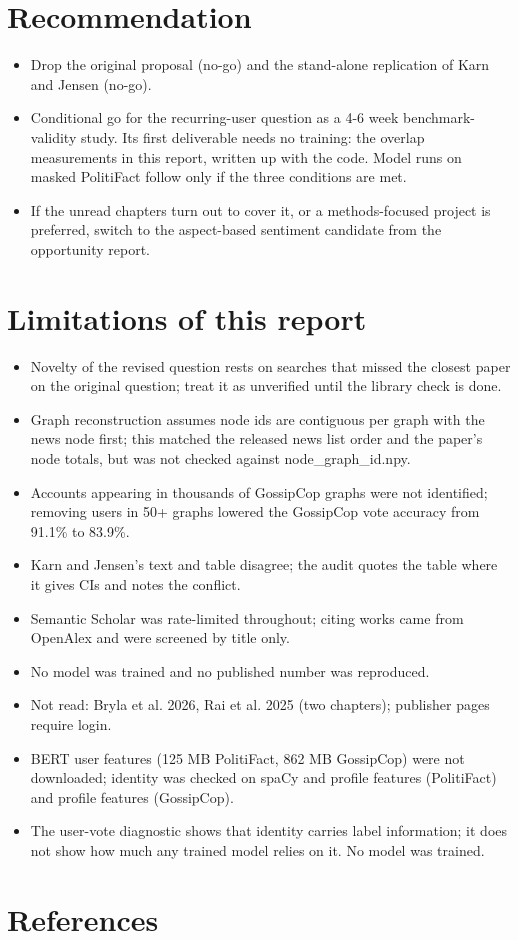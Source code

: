 \documentclass[11pt,a4paper]{article}
\begin{document}
\section{Recommendation}

\begin{itemize}
\item [E] Drop the original proposal (no-go) and the stand-alone replication of Karn and Jensen (no-go).
\item [E] Conditional go for the recurring-user question as a 4-6 week benchmark-validity study. Its first deliverable needs no training: the overlap measurements in this report, written up with the code. Model runs on masked PolitiFact follow only if the three conditions are met.
\item [S] If the unread chapters turn out to cover it, or a methods-focused project is preferred, switch to the aspect-based sentiment candidate from the opportunity report.
\end{itemize}

\section{Limitations of this report}

\begin{itemize}
\item Novelty of the revised question rests on searches that missed the closest paper on the original question; treat it as unverified until the library check is done.
\item Graph reconstruction assumes node ids are contiguous per graph with the news node first; this matched the released news list order and the paper's node totals, but was not checked against node\_graph\_id.npy.
\item Accounts appearing in thousands of GossipCop graphs were not identified; removing users in 50+ graphs lowered the GossipCop vote accuracy from 91.1\% to 83.9\%.
\item Karn and Jensen's text and table disagree; the audit quotes the table where it gives CIs and notes the conflict.
\item Semantic Scholar was rate-limited throughout; citing works came from OpenAlex and were screened by title only.
\item No model was trained and no published number was reproduced.
\item Not read: Bryla et al. 2026, Rai et al. 2025 (two chapters); publisher pages require login.
\item BERT user features (125 MB PolitiFact, 862 MB GossipCop) were not downloaded; identity was checked on spaCy and profile features (PolitiFact) and profile features (GossipCop).
\item The user-vote diagnostic shows that identity carries label information; it does not show how much any trained model relies on it. No model was trained.
\end{itemize}

\section{References}



\end{document}
